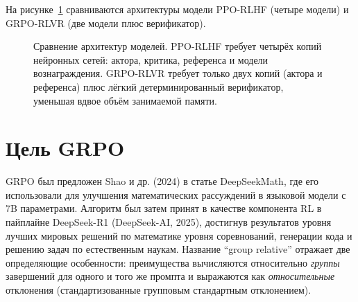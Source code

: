 На рисунке~\ref{fig:grpo-architecture} сравниваются архитектуры модели PPO-RLHF (четыре модели) и GRPO-RLVR (две модели плюс верификатор).

\begin{figure}[ht]
\centering
{}
\caption{Сравнение архитектур моделей. PPO-RLHF требует четырёх копий нейронных сетей: актора, критика, референса и модели вознаграждения. GRPO-RLVR требует только двух копий (актора и референса) плюс лёгкий детерминированный верификатор, уменьшая вдвое объём занимаемой памяти.}
\label{fig:grpo-architecture}
\end{figure}

\section{Цель GRPO}
\label{sec:grpo-objective}

GRPO был предложен Shao и др. (2024) в статье DeepSeekMath, где его использовали для улучшения математических рассуждений в языковой модели с 7B параметрами. Алгоритм был затем принят в качестве компонента RL в пайплайне DeepSeek-R1 (DeepSeek-AI, 2025), достигнув результатов уровня лучших мировых решений по математике уровня соревнований, генерации кода и решению задач по естественным наукам. Название ``group relative'' отражает две определяющие особенности: преимущества вычисляются относительно \emph{группы} завершений для одного и того же промпта и выражаются как \emph{относительные} отклонения (стандартизованные групповым стандартным отклонением).

